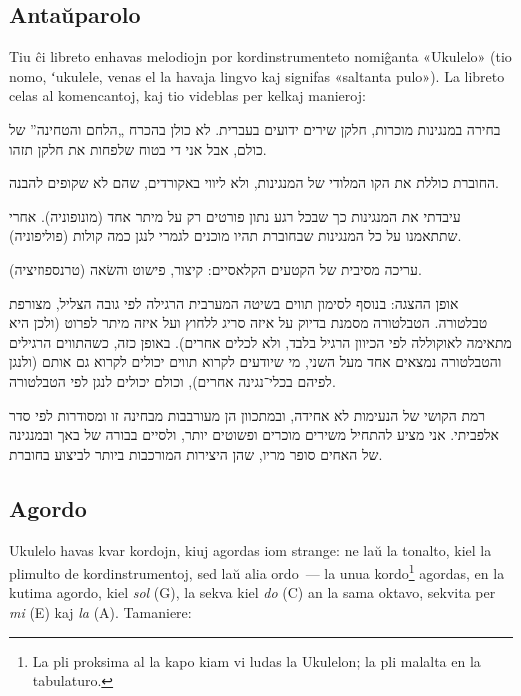 \subsection*{Antaŭparolo}

Tiu ĉi libreto enhavas melodiojn por kordinstrumenteto nomiĝanta «Ukulelo» (tio nomo, {ʻ}ukulele, venas el la havaja lingvo kaj signifas «saltanta pulo»). La libreto celas al komencantoj, kaj tio videblas per kelkaj manieroj:

\begin{compactitem}
	\item בחירה במנגינות מוכרות, חלקן שירים ידועים בעברית. לא כולן בהכרח „הלחם והטחינה” של כולם, אבל אני די בטוח שלפחות את חלקן תזהו.
	\item החוברת כוללת את הקו המלודי של המנגינות, ולא ליווי באקורדים, שהם לא שקופים להבנה.
	\item עיבדתי את המנגינות כך שבכל רגע נתון פורטים רק על מיתר אחד (מונופוניה). אחרי שתתאמנו על כל המנגינות שבחוברת תהיו מוכנים לגמרי לנגן כמה קולות (פוליפוניה).
	\item עריכה מסיבית של הקטעים הקלאסיים: קיצור, פישוט והשׂאה (טרנספוזיציה).
	\item אופן ההצגה: בנוסף לסימון תווים בשיטה המערבית הרגילה לפי גובה הצליל, מצורפת טבלטורה. הטבלטורה מסמנת בדיוק על איזה סריג ללחוץ ועל איזה מיתר לפרוט (ולכן היא מתאימה לאוקוללה לפי הכיוון הרגיל בלבד, ולא לכלים אחרים). באופן כזה, כשהתווים הרגילים והטבלטורה נמצאים אחד מעל השני, מי שיודעים לקרוא תווים יכולים לקרוא גם אותם (ולנגן לפיהם בכלי־נגינה אחרים), וכולם יכולים לנגן לפי הטבלטורה.
\end{compactitem}
רמת הקושי של הנעימות לא אחידה, ובמתכוון הן מעורבבות מבחינה זו ומסודרות לפי סדר אלפביתי. אני מציע להתחיל משירים מוכרים ופשוטים יותר, ולסיים בבורה של באך ובמנגינה של האחים סופר מריו, שהן היצירות המורכבות ביותר לביצוע בחוברת.



\subsection*{Agordo}

\begin{figure}\vspace{-2\baselineskip}
\end{figure}
Ukulelo havas kvar kordojn, kiuj agordas iom strange: ne laŭ la tonalto, kiel la plimulto de kordinstrumentoj, sed laŭ alia ordo~— la unua kordo\footnote{La pli proksima al la kapo kiam vi ludas la Ukulelon; la pli malalta en la tabulaturo.} agordas, en la kutima agordo, kiel \emph{sol} (G), la sekva kiel \emph{do} (C) an la sama oktavo, sekvita per \emph{mi} (E) kaj \emph{la} (A). Tamaniere:


